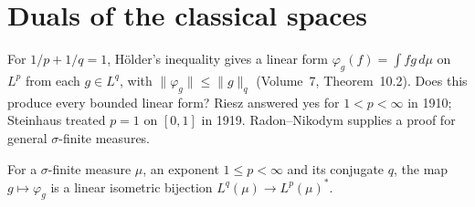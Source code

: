 \section{Duals of the classical spaces}

For $1/p+1/q=1$, H\"older's inequality gives a linear form $\varphi_g(f)=\int fg\,d\mu$ on $L^p$ from each $g\in L^q$, with $\|\varphi_g\|\le\|g\|_q$ (Volume~7, Theorem~10.2). Does this produce every bounded linear form? Riesz answered yes for $1<p<\infty$ in 1910; Steinhaus treated $p=1$ on $[0,1]$ in 1919. Radon--Nikodym supplies a proof for general $\sigma$-finite measures.

\begin{theorem}[duality of $L^p$]\label{thm:lpdual}
For a $\sigma$-finite measure $\mu$, an exponent $1\le p<\infty$ and its conjugate $q$, the map $g\mapsto\varphi_g$ is a linear isometric bijection $L^q(\mu)\to L^p(\mu)^*$.
\end{theorem}
